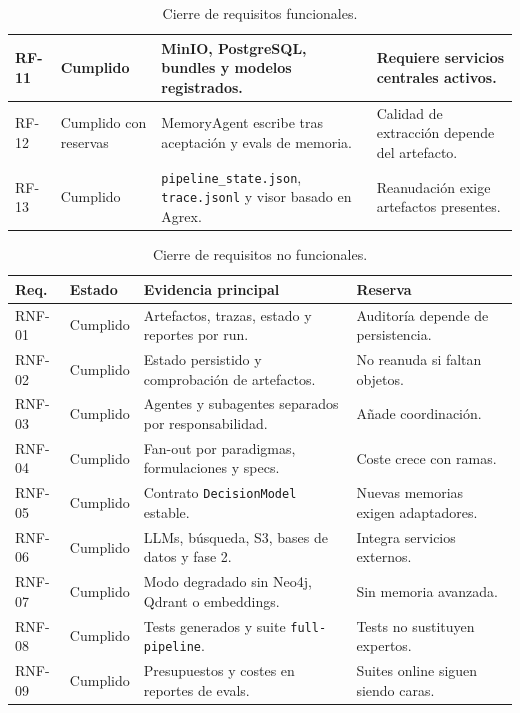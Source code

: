 \begin{table}[H]
\begin{center}
\begin{tabular}{|p{1.5cm}|p{2.0cm}|p{6.2cm}|p{3.0cm}|}
RF-11 & Cumplido & MinIO, PostgreSQL, bundles y modelos registrados. & Requiere servicios centrales activos. \\ \hline
RF-12 & Cumplido con reservas & MemoryAgent escribe tras aceptación y evals de memoria. & Calidad de extracción depende del artefacto. \\ \hline
RF-13 & Cumplido & \texttt{pipeline\_state.json}, \texttt{trace.jsonl} y visor basado en Agrex. & Reanudación exige artefactos presentes. \\ \hline
\end{tabular}
\caption{Cierre de requisitos funcionales.}
\end{center}
\end{table}

\begin{table}[H]
\begin{center}
\scriptsize
\begin{tabular}{|p{1.45cm}|p{1.8cm}|p{6.2cm}|p{2.45cm}|} \hline
\textbf{Req.} & \textbf{Estado} & \textbf{Evidencia principal} & \textbf{Reserva} \\ \hline
RNF-01 & Cumplido & Artefactos, trazas, estado y reportes por run. & Auditoría depende de persistencia. \\ \hline
RNF-02 & Cumplido & Estado persistido y comprobación de artefactos. & No reanuda si faltan objetos. \\ \hline
RNF-03 & Cumplido & Agentes y subagentes separados por responsabilidad. & Añade coordinación. \\ \hline
RNF-04 & Cumplido & Fan-out por paradigmas, formulaciones y specs. & Coste crece con ramas. \\ \hline
RNF-05 & Cumplido & Contrato \texttt{DecisionModel} estable. & Nuevas memorias exigen adaptadores. \\ \hline
RNF-06 & Cumplido & LLMs, búsqueda, S3, bases de datos y fase 2. & Integra servicios externos. \\ \hline
RNF-07 & Cumplido & Modo degradado sin Neo4j, Qdrant o embeddings. & Sin memoria avanzada. \\ \hline
RNF-08 & Cumplido & Tests generados y suite \texttt{full-pipeline}. & Tests no sustituyen expertos. \\ \hline
RNF-09 & Cumplido & Presupuestos y costes en reportes de evals. & Suites online siguen siendo caras. \\ \hline
\end{tabular}
\caption{Cierre de requisitos no funcionales.}
\end{center}
\end{table}

